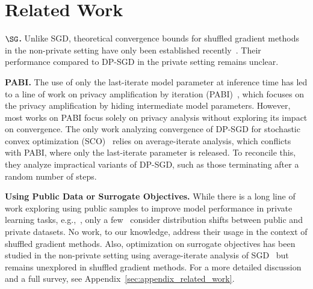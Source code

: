 \section{Related Work}
\label{subsec:related_work}


\textbf{$\SG$.} Unlike SGD, theoretical convergence bounds for shuffled gradient methods in the non-private setting have only been established recently~\cite{mishchenko2021rr, mishchenko2021prox_fed_rr, liu2024last_iterate_shuffled_gradient}. Their performance compared to DP-SGD in the private setting remains unclear. 

\textbf{PABI.} The use of only the last-iterate model parameter at inference time has led to a line of work on privacy amplification by iteration (PABI)~\cite{Feldman2018privacy_amp_iter, altschuler2022apple_paper, ye2022singapore_paper}, which focuses on the privacy amplification by hiding intermediate model parameters. However, most works on PABI focus solely on privacy analysis without exploring its impact on convergence.
The only work analyzing convergence of DP-SGD for stochastic convex optimization (SCO)~\cite{Feldman2018privacy_amp_iter} relies on average-iterate analysis, which conflicts with PABI, where only the last-iterate parameter is released. To reconcile this, they analyze impractical variants of DP-SGD, such as those terminating after a random number of steps. 

\textbf{Using Public Data or Surrogate Objectives.} While there is a long line of work exploring using public samples to improve model performance in private learning tasks, e.g.,~\cite{bassily20priv_query_release_pub_data, ullah2024public_data_priv_sco}, only a few~\cite{bie2022private_est_pub_data_shift, Bassily2023priv_adp_from_pub_source} consider distribution shifts between public and private datasets. No work, to our knowledge, address their usage in the context of shuffled gradient methods.
Also, optimization on surrogate objectives has been studied in the non-private setting using average-iterate analysis of SGD~\cite{Woodworth2023two_losses} but remains unexplored in shuffled gradient methods.
For a more detailed discussion and a full survey, see Appendix~\ref{sec:appendix_related_work}.
